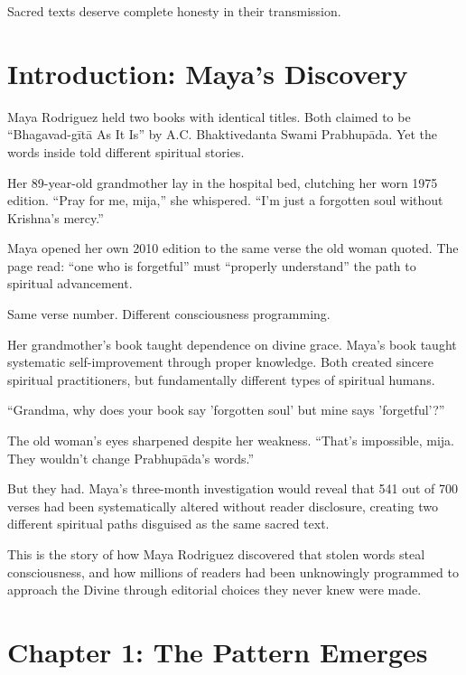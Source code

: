 \documentclass[11pt,twoside]{book}
\begin{document}
Sacred texts deserve complete honesty in their transmission.

\chapter*{Introduction: Maya's Discovery}

Maya Rodriguez held two books with identical titles. Both claimed to be ``Bhagavad-gītā As It Is'' by A.C. Bhaktivedanta Swami Prabhupāda. Yet the words inside told different spiritual stories.

Her 89-year-old grandmother lay in the hospital bed, clutching her worn 1975 edition. ``Pray for me, mija,'' she whispered. ``I'm just a forgotten soul without Krishna's mercy.''

Maya opened her own 2010 edition to the same verse the old woman quoted. The page read: ``one who is forgetful'' must ``properly understand'' the path to spiritual advancement.

Same verse number. Different consciousness programming.

Her grandmother's book taught dependence on divine grace. Maya's book taught systematic self-improvement through proper knowledge. Both created sincere spiritual practitioners, but fundamentally different types of spiritual humans.

``Grandma, why does your book say 'forgotten soul' but mine says 'forgetful'?''

The old woman's eyes sharpened despite her weakness. ``That's impossible, mija. They wouldn't change Prabhupāda's words.''

But they had. Maya's three-month investigation would reveal that 541 out of 700 verses had been systematically altered without reader disclosure, creating two different spiritual paths disguised as the same sacred text.

This is the story of how Maya Rodriguez discovered that stolen words steal consciousness, and how millions of readers had been unknowingly programmed to approach the Divine through editorial choices they never knew were made.

\chapter*{Chapter 1: The Pattern Emerges}
\end{document}
